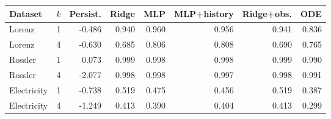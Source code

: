 \begin{tabular}{lrrrrrrr}
\toprule
Dataset & $k$ & Persist. & Ridge & MLP & MLP+history & Ridge+obs. & ODE \\
\midrule
Lorenz & 1 & -0.486 & 0.940 & 0.960 & 0.956 & 0.941 & 0.836 \\
Lorenz & 4 & -0.630 & 0.685 & 0.806 & 0.808 & 0.690 & 0.765 \\
Rossler & 1 & 0.073 & 0.999 & 0.998 & 0.998 & 0.999 & 0.990 \\
Rossler & 4 & -2.077 & 0.998 & 0.998 & 0.997 & 0.998 & 0.991 \\
Electricity & 1 & -0.738 & 0.519 & 0.475 & 0.456 & 0.519 & 0.387 \\
Electricity & 4 & -1.249 & 0.413 & 0.390 & 0.404 & 0.413 & 0.299 \\
\bottomrule
\end{tabular}
